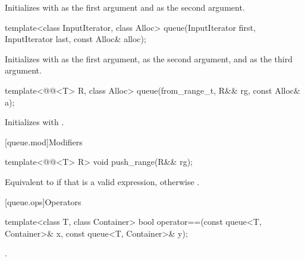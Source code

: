 \begin{itemdescr}
\pnum
\effects
Initializes  with  as the first argument and 
as the second argument.
\end{itemdescr}

%
\begin{itemdecl}
template<class InputIterator, class Alloc>
  queue(InputIterator first, InputIterator last, const Alloc& alloc);
\end{itemdecl}

\begin{itemdescr}
\pnum
\effects
Initializes  with
 as the first argument,
 as the second argument, and
 as the third argument.
\end{itemdescr}

%
\begin{itemdecl}
template<@@<T> R, class Alloc>
  queue(from_range_t, R&& rg, const Alloc& a);
\end{itemdecl}

\begin{itemdescr}
\pnum
\effects
Initializes  with
.
\end{itemdescr}

[queue.mod]{Modifiers}

%
\begin{itemdecl}
template<@@<T> R>
  void push_range(R&& rg);
\end{itemdecl}

\begin{itemdescr}
\pnum
\effects
Equivalent to 
if that is a valid expression,
otherwise .
\end{itemdescr}

[queue.ops]{Operators}

%
\begin{itemdecl}
template<class T, class Container>
  bool operator==(const queue<T, Container>& x, const queue<T, Container>& y);
\end{itemdecl}

\begin{itemdescr}
\pnum
\returns
{}.
\end{itemdescr}


